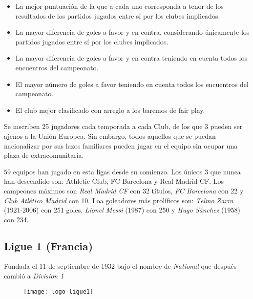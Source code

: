 \begin{itemize}

	\item La mejor puntuación de la que a cada uno corresponda a tenor de los resultados de los partidos jugados entre sí por los clubes implicados.

	\item La mayor diferencia de goles a favor y en contra, considerando únicamente los partidos jugados entre sí por los clubes implicados.

	\item La mayor diferencia de goles a favor y en contra teniendo en cuenta todos los encuentros del campeonato.

	\item El mayor número de goles a favor teniendo en cuenta todos los encuentros del campeonato.

	\item El club mejor clasificado con arreglo a los baremos de fair play.

\end{itemize}

Se inscriben 25 jugadores cada temporada a cada Club, de los que 3 pueden ser ajenos a la Unión Europea. Sin embargo, todos aquellos que se puedan nacionalizar por sus lazos familiares pueden jugar en el equipo sin ocupar una plaza de extracomunitaria.

59 equipos han jugado en esta ligas desde su comienzo. Los únicos 3 que nunca han descendido son: Athletic Club, FC Barcelona y Real Madrid CF. Los campeones máximos son \emph{Real Madrid CF} con 32 títulos, \emph{FC Barcelona} con 22 y \emph{Club Atlético Madrid} con 10. Loa goleadores más prolíficos son: \emph{Telmo Zarra} (1921-2006) con 251 goles, \emph{Lionel Messi} (1987) con 250 y \emph{Hugo Sánchez} (1958) con 234. \cite{primera}

\subsection{Ligue 1 (Francia)}

Fundada el 11 de septiembre de 1932 bajo el nombre de \emph{National} que después cambió a \emph{Division 1}

\begin{figure}[!htb]\centering
   \begin {minipage}{0.5\textwidth}
     \texttt{[image: logo-ligue1]}
   \end{minipage}
\end{figure}


